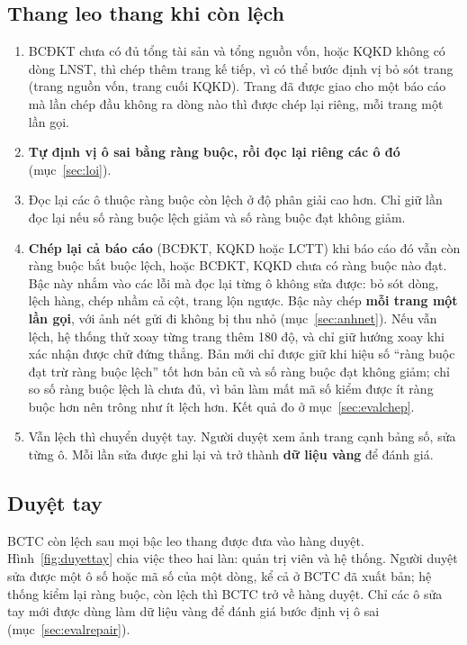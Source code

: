 \documentclass[12pt,a4paper]{report}
\newcommand{\enquote}[1]{“#1”}
\begin{document}
\subsection{Thang leo thang khi còn lệch}\label{sec:leothang}
\begin{enumerate}
  \item BCĐKT chưa có đủ tổng tài sản và tổng nguồn vốn, hoặc KQKD không có dòng LNST, thì chép thêm trang kế tiếp, vì
        có thể bước định vị bỏ sót trang (trang nguồn vốn, trang cuối KQKD). Trang đã được giao cho một báo cáo mà lần
        chép đầu không ra dòng nào thì được chép lại riêng, mỗi trang một lần gọi.
  \item \textbf{Tự định vị ô sai bằng ràng buộc, rồi đọc lại riêng các ô đó} (mục~\ref{sec:loi}).
  \item Đọc lại các ô thuộc ràng buộc còn lệch ở độ phân giải cao hơn. Chỉ giữ lần đọc lại nếu số ràng buộc lệch giảm và
        số ràng buộc đạt không giảm.
  \item \textbf{Chép lại cả báo cáo} (BCĐKT, KQKD hoặc LCTT) khi báo cáo đó vẫn còn ràng buộc bắt buộc lệch, hoặc
        BCĐKT, KQKD chưa có ràng buộc nào đạt. Bậc này nhắm vào các lỗi mà đọc lại từng ô không sửa được: bỏ sót dòng,
        lệch hàng, chép nhầm cả cột, trang lộn ngược. Bậc này chép \textbf{mỗi trang một lần gọi}, với ảnh nét gửi đi
        không bị thu nhỏ (mục~\ref{sec:anhnet}). Nếu vẫn lệch, hệ thống thử xoay từng trang thêm 180 độ, và chỉ giữ hướng
        xoay khi xác nhận được chữ đứng thẳng. Bản mới chỉ được giữ khi hiệu số \enquote{ràng buộc đạt trừ ràng buộc
        lệch} tốt hơn bản cũ và số ràng buộc đạt không giảm; chỉ so số ràng buộc lệch là chưa đủ, vì bản làm mất mã số
        kiểm được ít ràng buộc hơn nên trông như ít lệch hơn. Kết quả đo ở mục~\ref{sec:evalchep}.
  \item Vẫn lệch thì chuyển duyệt tay. Người duyệt xem ảnh trang cạnh bảng số, sửa từng ô. Mỗi lần sửa được ghi lại và
        trở thành \textbf{dữ liệu vàng} để đánh giá.
\end{enumerate}

\subsection{Duyệt tay}\label{sec:duyettay}
BCTC còn lệch sau mọi bậc leo thang được đưa vào hàng duyệt. Hình~\ref{fig:duyettay} chia việc theo hai làn: quản trị
viên và hệ thống. Người duyệt sửa được một ô số hoặc mã số của một dòng, kể cả ở BCTC đã xuất bản; hệ thống kiểm lại
ràng buộc, còn lệch thì BCTC trở về hàng duyệt. Chỉ các ô sửa tay mới được dùng làm dữ liệu vàng để đánh giá bước định
vị ô sai (mục~\ref{sec:evalrepair}).
\end{document}
